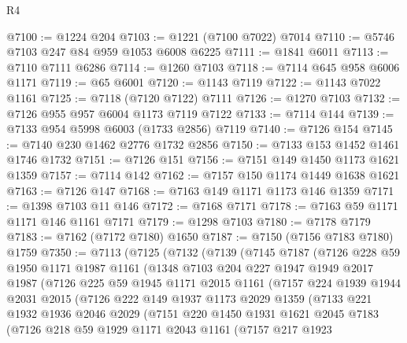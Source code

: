 \begin{lexlean}{R4}
\begin{coremodule}
@7100 := @1224 @204
@7103 := @1221 (@7100 @7022) @7014
@7110 := @5746 @7103 @247 @84 @959 @1053 @6008 @6225
@7111 := @1841 @6011
@7113 := @7110 @7111 @6286
@7114 := @1260 @7103
@7118 := @7114 @645 @958 @6006 @1171
@7119 := @65 @6001
@7120 := @1143 @7119
@7122 := @1143 @7022 @1161
@7125 := @7118 (@7120 @7122) @7111
@7126 := @1270 @7103
@7132 := @7126 @955 @957 @6004 @1173 @7119 @7122
@7133 := @7114 @144
@7139 := @7133 @954 @5998 @6003 (@1733 @2856) @7119
@7140 := @7126 @154
@7145 := @7140 @230 @1462 @2776 @1732 @2856
@7150 := @7133 @153 @1452 @1461 @1746 @1732
@7151 := @7126 @151
@7156 := @7151 @149 @1450 @1173 @1621 @1359
@7157 := @7114 @142
@7162 := @7157 @150 @1174 @1449 @1638 @1621
@7163 := @7126 @147
@7168 := @7163 @149 @1171 @1173 @146 @1359
@7171 := @1398 @7103 @11 @146
@7172 := @7168 @7171
@7178 := @7163 @59 @1171 @1171 @146 @1161 @7171
@7179 := @1298 @7103
@7180 := @7178 @7179
@7183 := @7162 (@7172 @7180) @1650
@7187 := @7150 (@7156 @7183 @7180) @1759
@7350 := @7113
    (@7125
      (@7132
        (@7139
          (@7145
            @7187
            (@7126
              @228
              @59
              @1950
              @1171
              @1987
              @1161
              (@1348
                @7103
                @204
                @227
                @1947
                @1949
                @2017
                @1987
                (@7126
                  @225
                  @59
                  @1945
                  @1171
                  @2015
                  @1161
                  (@7157
                    @224
                    @1939
                    @1944
                    @2031
                    @2015
                    (@7126
                      @222
                      @149
                      @1937
                      @1173
                      @2029
                      @1359
                      (@7133
                        @221
                        @1932
                        @1936
                        @2046
                        @2029
                        (@7151
                          @220
                          @1450
                          @1931
                          @1621
                          @2045
                          @7183
                          (@7126
                            @218
                            @59
                            @1929
                            @1171
                            @2043
                            @1161
                            (@7157
                              @217
                              @1923

\end{coremodule}
\end{lexlean}

